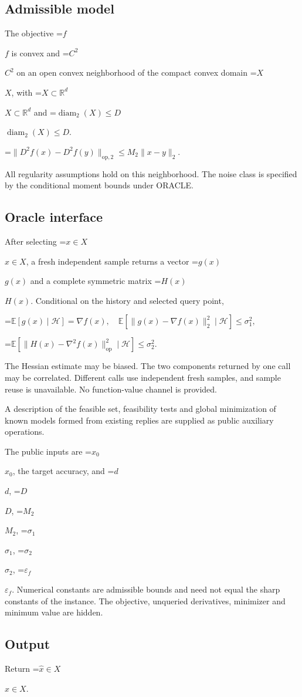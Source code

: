 \documentclass[10pt,a4paper]{article}
\newcommand{\AtlasMath}[1]{\par\begingroup\centering\setbox0=\hbox{$\displaystyle #1$}\ifdim\wd0>1.4\linewidth\typeout{ATLAS WIDE FORMULA: \the\wd0}\fi\ifdim\wd0>\linewidth\resizebox{\linewidth}{!}{\box0}\else\box0\fi\par\endgroup}
\newcommand{\AtlasInlineMath}[1]{\begingroup\setbox0=\hbox{$#1$}\ifdim\wd0>.4\linewidth\endgroup\AtlasMath{#1}\else\endgroup$#1$\fi}
\begin{document}
\subsection{Admissible model}
The objective \AtlasInlineMath{f} is convex and \AtlasInlineMath{C^2} on an open convex neighborhood of the compact convex domain \AtlasInlineMath{X}, with \AtlasInlineMath{X\subset\mathbb{R}^d} and \AtlasInlineMath{\operatorname{diam}_2(X)\le D}.


\AtlasMath{\|D^{2}f(x)-D^{2}f(y)\|_{\mathrm{op},2}\le M_2\|x-y\|_{2}.}


All regularity assumptions hold on this neighborhood. The noise class is specified by the conditional moment bounds under ORACLE.

\subsection{Oracle interface}
After selecting \AtlasInlineMath{x\in X}, a fresh independent sample returns a vector \AtlasInlineMath{g(x)} and a complete symmetric matrix \AtlasInlineMath{H(x)}. Conditional on the history and selected query point,


\AtlasMath{\mathbb{E}[g(x)\mid\mathcal{H}]=\nabla f(x),\quad\mathbb{E}[\|g(x)-\nabla f(x)\|_2^2\mid\mathcal{H}]\le\sigma_1^2,}



\AtlasMath{\mathbb{E}[\|H(x)-\nabla^2f(x)\|_{\mathrm{op}}^2\mid\mathcal{H}]\le\sigma_2^2.}


The Hessian estimate may be biased. The two components returned by one call may be correlated. Different calls use independent fresh samples, and sample reuse is unavailable. No function-value channel is provided.

A description of the feasible set, feasibility tests and global minimization of known models formed from existing replies are supplied as public auxiliary operations.

The public inputs are \AtlasInlineMath{x_0}, the target accuracy, and \AtlasInlineMath{d}, \AtlasInlineMath{D}, \AtlasInlineMath{M_2}, \AtlasInlineMath{\sigma_1}, \AtlasInlineMath{\sigma_2}, \AtlasInlineMath{\varepsilon_f}. Numerical constants are admissible bounds and need not equal the sharp constants of the instance. The objective, unqueried derivatives, minimizer and minimum value are hidden.

\subsection{Output}
Return \AtlasInlineMath{\widehat{x}\in X}.
\end{document}
